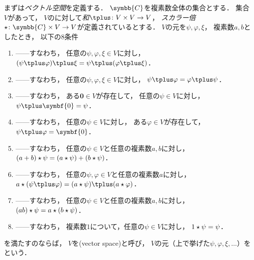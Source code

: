 \documentclass[
]{sotsu}
\newcommand{\fire}[1]{\textcolor{fire}{#1}}
\newcommand{\water}[1]{\textcolor{water}{#1}}
\begin{document}
まずは\emph{ベクトル空間}を定義する．
$\symbb{C}$を複素数全体の集合とする．
集合$V$があって，
$V$のに対して\emph{和}$\vecplus \colon V \times V \to V$，
\emph{スカラー倍}$\scaprod \colon \symbb{C} \times V \to V$が定義されているとする．
$V$の元を$\psi, \varphi, \xi$，
複素数$a, b$としたとき，
以下の8条件
\begin{enumerate}
    \item \label{vector:sum-associative}
        ------すなわち，
        \fire{任意の$\psi, \varphi, \xi \in V$}に対し，
        $(\psi \vecplus \varphi) \vecplus \xi = \psi \vecplus (\varphi \vecplus \xi)$．
    \item \label{vector:sum-commutative}
        ------すなわち，
        \fire{任意の$\psi, \varphi, \xi \in V$}に対し，
        $\psi \vecplus \varphi = \varphi \vecplus \psi$．
    \item \label{vector:sum-zero}
        ------すなわち，
        \water{ある$\symbf{0} \in V$}が存在して，
        \fire{任意の$\psi \in V$}に対し，$\psi \vecplus \symbf{0} = \psi$．
    \item \label{vector:sum-opposite}
        ------すなわち，
        \fire{任意の$\psi \in V$}に対し，
        \water{ある$\varphi \in V$}が存在して，
        $\psi \vecplus \varphi = \symbf{0}$．
    \item \label{vector:scalar-sum}
        ------すなわち，
        \fire{任意の$\psi \in V$}と\fire{任意の複素数$a, b$}に対し，
        $(a + b) \mathbin{\star} \psi = (a \mathbin{\star} \psi) + (b \mathbin{\star} \psi)$．
    \item \label{vector:scalar-distributive}
        ------すなわち，
        \fire{任意の$\psi, \varphi \in V$}と\fire{任意の複素数$a$}に対し，
        $a \scaprod (\psi \vecplus \varphi) = (a \scaprod \psi) \vecplus (a \scaprod \varphi)$．
    \item \label{vector:scalar-prod}
        ------すなわち，
        \fire{任意の$\psi \in V$}と\fire{任意の複素数$a, b$}に対し，
        $(ab) \mathbin{\star} \psi = a \mathbin{\star} (b \mathbin{\star} \psi)$．
    \item \label{vector:scalar-identity}
        ------すなわち，
        複素数$1$について，\fire{任意の$\psi \in V$}に対し，
        $1 \mathbin{\star} \psi = \psi$．
\end{enumerate}
を満たすのならば，
$V$を(vector space)と呼び，
$V$の元（上で挙げた$\psi, \varphi, \xi, \dotsc$）をという．
\end{document}
